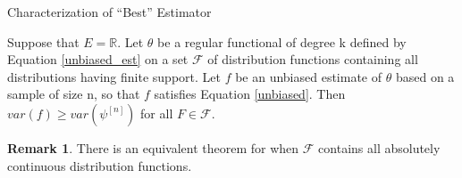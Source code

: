\documentclass{beamer}
\newcommand{\R}{{\mathbb{R}}}
\theoremstyle{definition}
\numberwithin{Def}{section}
\newtheorem{Rmk}{Remark}
\begin{document}
\begin{frame}{Characterization of ``Best'' Estimator}
 \begin{theorem}
    Suppose that $E = \R$. Let $\theta$ be a regular functional of degree k defined by Equation \ref{unbiased_est} on a set $\mathcal{F}$ of distribution functions containing all distributions having finite support. Let $f$ be an unbiased estimate of $\theta$ based on a sample of size n, so that $f$ satisfies Equation \ref{unbiased}. Then $var(f) \geq var(\psi^{[n]})$ for all $F \in \mathcal{F}$. 
    \end{theorem}



  \pause   
     \begin{Rmk}
 There is an equivalent theorem for when $\mathcal{F}$ contains all absolutely continuous distribution functions. 
 \end{Rmk}
\end{frame}
\end{document}
